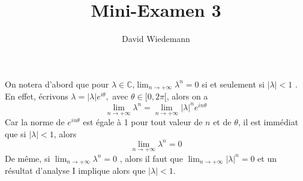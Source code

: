 \documentclass[11pt, a4paper]{article}
\begin{document}
\title{Mini-Examen 3}
\author{David Wiedemann}
\maketitle
On notera d'abord que pour $\lambda \in \mathbb{C}$,$ \lim_{n \to  + \infty} \lambda^{n} = 0$ si et seulement si $|\lambda|< 1$ .\\
En effet, écrivons $\lambda= |\lambda| e^{i \theta},  $ avec $\theta \in [ 0, 2\pi[ $, alors on a
\[ 
\lim_{n \to  + \infty} \lambda^{n} = \lim_{n \to  + \infty} |\lambda|^{n} e^{in \theta} 
\]
Car la norme de $ e^{i n \theta} $ est égale à 1 pour tout valeur de $n$  et de $\theta$, il est immédiat que si $|\lambda| < 1$, alors
\[ 
\lim_{n \to  + \infty} \lambda^{n}= 0
\]
De même, si $ \lim_{n \to  + \infty} \lambda^{n}= 0$ , alors il faut que $ \lim_{n \to  + \infty} |\lambda|^{n}=0$ et un résultat d'analyse I implique alors que $ |\lambda| <1$.\\
\end{document}
